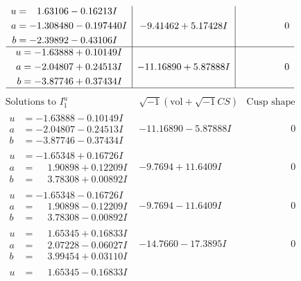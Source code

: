 \documentclass[1p]{elsarticle_modified}
\theoremstyle{definition}
\newcommand{\I}{\sqrt{-1}}
\begin{document}
$$\begin{array}{c|c|c}
\begin{aligned}
u &= \phantom{-}1.63106 - 0.16213 I \\
a &= -1.308480 - 0.197440 I \\
b &= -2.39892 - 0.43106 I\end{aligned}
 & -9.41462 + 5.17428 I & \phantom{-0.000000 } 0 \\ \hline\begin{aligned}
u &= -1.63888 + 0.10149 I \\
a &= -2.04807 + 0.24513 I \\
b &= -3.87746 + 0.37434 I\end{aligned}
 & -11.16890 + 5.87888 I & \phantom{-0.000000 } 0\\
 \hline 
 \end{array}$$\newpage$$\begin{array}{c|c|c}  
\text{Solutions to }I^u_{1}& \I (\text{vol} + \sqrt{-1}CS) & \text{Cusp shape}\\
 \hline 
\begin{aligned}
u &= -1.63888 - 0.10149 I \\
a &= -2.04807 - 0.24513 I \\
b &= -3.87746 - 0.37434 I\end{aligned}
 & -11.16890 - 5.87888 I & \phantom{-0.000000 } 0 \\ \hline\begin{aligned}
u &= -1.65348 + 0.16726 I \\
a &= \phantom{-}1.90898 + 0.12209 I \\
b &= \phantom{-}3.78308 + 0.00892 I\end{aligned}
 & -9.7694 + 11.6409 I & \phantom{-0.000000 } 0 \\ \hline\begin{aligned}
u &= -1.65348 - 0.16726 I \\
a &= \phantom{-}1.90898 - 0.12209 I \\
b &= \phantom{-}3.78308 - 0.00892 I\end{aligned}
 & -9.7694 - 11.6409 I & \phantom{-0.000000 } 0 \\ \hline\begin{aligned}
u &= \phantom{-}1.65345 + 0.16833 I \\
a &= \phantom{-}2.07228 - 0.06027 I \\
b &= \phantom{-}3.99454 + 0.03110 I\end{aligned}
 & -14.7660 - 17.3895 I & \phantom{-0.000000 } 0 \\ \hline\begin{aligned}
u &= \phantom{-}1.65345 - 0.16833 I \\

\end{aligned}
\end{array}$$
\end{document}
